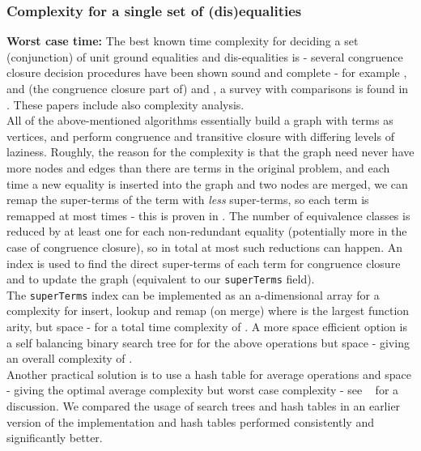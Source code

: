 \subsubsection*{Complexity for a single set of (dis)equalities}
\textbf{Worst case time:} The best known time complexity for deciding a set (conjunction) of unit ground equalities and dis-equalities is  - several congruence closure decision procedures have been shown sound and complete - for example \cite{DowneySethiTarjan},\cite{NieuwenhuisOliveras03} and (the congruence closure part of) \cite{Shostak84} and \cite{NelsonOppen80}, a survey with comparisons is found in \cite{BachmairTiwari00}. These papers include also complexity analysis.\\
All of the above-mentioned algorithms essentially build a graph with terms as vertices, and perform congruence and transitive closure with differing levels of laziness.
Roughly, the reason for the  complexity is that the graph need never have more nodes and edges than there are terms in the original problem, and each time a new equality is inserted into the graph and two nodes are merged, we can remap the super-terms of the term with \emph{less} super-terms, so each term is remapped at most  times - this is proven in \cite{DowneySethiTarjan}. 
The number of equivalence classes is reduced by at least one for each non-redundant equality (potentially more in the case of congruence closure), so in total at most  such reductions can happen. An index is used to find the direct super-terms of each term for congruence closure and to update the graph (equivalent to our \lstinline|superTerms| field).\\
The \lstinline|superTerms| index can be implemented as an a-dimensional array for a complexity  for insert, lookup and remap (on merge) where  is the largest function arity, but space  - for a total time complexity of .
A more space efficient option is a self balancing binary search tree for  for the above operations but space  - giving an overall complexity of . \\
Another practical solution is to use a hash table for average  operations and  space - giving the optimal average complexity but worst case  complexity - see ~\cite{DowneySethiTarjan} for a discussion. We compared the usage of search trees and hash tables in an earlier version of the implementation and hash tables performed consistently and significantly better.\\

